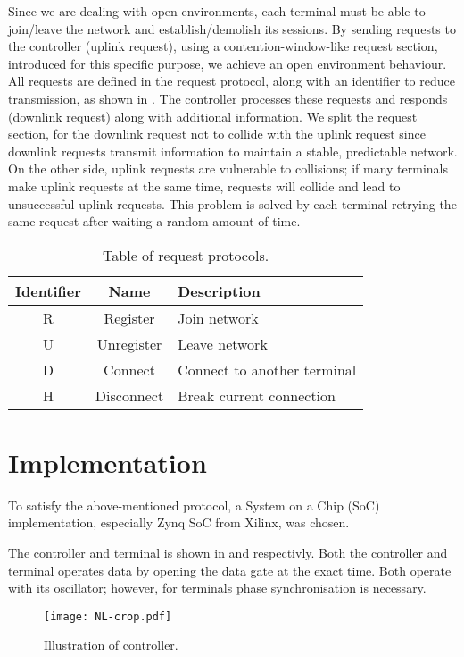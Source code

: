 ﻿\documentclass[twocolumn,9pt]{ltjsarticle}
\renewcommand{\ref}{\Cref}
\begin{document}
Since we are dealing with open environments, each terminal must be able to join/leave the network and establish/demolish its sessions.
By sending requests to the controller (uplink request), using a contention-window-like request section, introduced for this specific purpose, we achieve an open environment behaviour.
All requests are defined in the request protocol, along with an identifier to reduce transmission, as shown in \ref{tab:request}.
The controller processes these requests and responds (downlink request) along with additional information.
We split the request section, for the downlink request not to collide with the uplink request since downlink requests transmit information to maintain a stable, predictable network.
On the other side, uplink requests are vulnerable to collisions; if many terminals make uplink requests at the same time, requests will collide and lead to unsuccessful uplink requests.
This problem is solved by each terminal retrying the same request after waiting a random amount of time.
\begin{table}[tb]
  \centering
  \small
  \caption{\label{tab:request}
    Table of request protocols.
  }
  \begin{tabularx}{\linewidth}{ccl}
    \hline
    Identifier & Name & Description\\
    \hline \hline
    R & Register & Join network\\
    U & Unregister & Leave network\\
    D & Connect & Connect to another terminal\\
    H & Disconnect & Break current connection\\
    \hline
  \end{tabularx}
\end{table}

\section{Implementation}
To satisfy the above-mentioned protocol, a System on a Chip (SoC) implementation, especially Zynq SoC from Xilinx\textregistered, was chosen.

The controller and terminal is shown in \ref{fig:controller} and \ref{fig:terminal} respectivly.
Both the controller and terminal operates data by opening the data gate at the exact time.
Both operate with its oscillator; however, for terminals phase synchronisation is necessary.

\begin{figure}[tb]
  \centering
  \texttt{[image: NL-crop.pdf]}
  \caption{\label{fig:controller}
    Illustration of controller.
  }
\end{figure}
\end{document}
